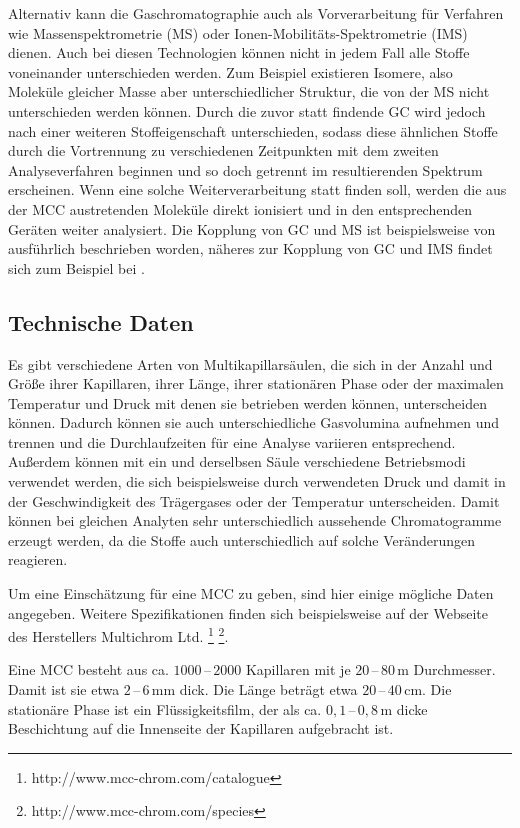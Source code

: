 Alternativ kann die Gaschromatographie auch als Vorverarbeitung für Verfahren wie Massenspektrometrie (MS) oder Ionen-Mobilitäts-Spektrometrie (IMS) dienen. Auch bei diesen Technologien können nicht in jedem Fall alle Stoffe voneinander unterschieden werden. Zum Beispiel existieren Isomere, also Moleküle gleicher Masse aber unterschiedlicher Struktur, die von der MS nicht unterschieden werden können. Durch die zuvor statt findende GC wird jedoch nach einer weiteren Stoffeigenschaft unterschieden, sodass diese ähnlichen Stoffe durch die Vortrennung zu verschiedenen Zeitpunkten mit dem zweiten Analyseverfahren beginnen und so doch getrennt im resultierenden Spektrum erscheinen. Wenn eine solche Weiterverarbeitung statt finden soll, werden die aus der MCC austretenden Moleküle direkt ionisiert und in den entsprechenden Geräten weiter analysiert.
Die Kopplung von GC und MS ist beispielsweise von \cite{Hubschmann2009} ausführlich beschrieben worden, näheres zur Kopplung von GC und IMS findet sich zum Beispiel bei \cite {Baumbach2009}. 


\subsection{Technische Daten}

Es gibt verschiedene Arten von Multikapillarsäulen, die sich in der Anzahl und Größe ihrer Kapillaren, ihrer Länge, ihrer stationären Phase oder der maximalen Temperatur und Druck mit denen sie betrieben werden können, unterscheiden können. Dadurch können sie auch unterschiedliche Gasvolumina aufnehmen und trennen und die Durchlaufzeiten für eine Analyse variieren entsprechend. Außerdem können mit ein und derselbsen Säule verschiedene Betriebsmodi verwendet werden, die sich beispielsweise durch verwendeten Druck und damit in der Geschwindigkeit des Trägergases oder der Temperatur unterscheiden. Damit können bei gleichen Analyten sehr unterschiedlich aussehende Chromatogramme erzeugt werden, da die Stoffe auch unterschiedlich auf solche Veränderungen reagieren.

Um eine Einschätzung für eine MCC zu geben, sind hier einige mögliche Daten angegeben. Weitere Spezifikationen finden sich beispielsweise auf der Webseite des Herstellers Multichrom Ltd. \footnote[1]{http://www.mcc-chrom.com/catalogue} \footnote[2]{http://www.mcc-chrom.com/species}.


Eine MCC besteht aus ca. $1000\,$--$\,2000$ Kapillaren mit je $20\,$--$\,80$\,\textmu m Durchmesser. Damit ist sie etwa $2\,$--$\,6$\,mm dick. Die Länge beträgt etwa  $20\,$--$\,40 $\,cm. Die stationäre Phase ist ein Flüssigkeitsfilm, der als ca. $0,1\,$--$\,0,8$\,\textmu m dicke Beschichtung auf die Innenseite der Kapillaren aufgebracht ist. 

